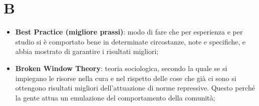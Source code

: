 % 
%
%

\section{B}

\begin{itemize}
	\item \textbf{Best Practice (migliore prassi)}: modo di fare che per esperienza e per studio si è comportato bene in determinate circostanze, note e specifiche, e abbia mostrato di garantire i risultati migliori;

	\item \textbf{Broken Window Theory}: teoria sociologica, secondo la quale se si impiegano le risorse nella cura e nel rispetto delle cose che già ci sono si ottengono risultati migliori dell'attuazione di norme repressive. Questo perché la gente attua un emulazione del comportamento della comunità;

\end{itemize}